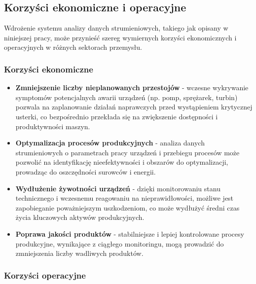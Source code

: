 \subsection{Korzyści ekonomiczne i operacyjne}
\label{subsec:korzysci}

Wdrożenie systemu analizy danych strumieniowych, takiego jak opisany w niniejszej pracy, może przynieść szereg wymiernych korzyści ekonomicznych i operacyjnych w różnych sektorach przemysłu.

\subsubsection{Korzyści ekonomiczne}
\label{subsubsec:korzysci_ekonomiczne}

\begin{itemize}
    \item \textbf{Zmniejszenie liczby nieplanowanych przestojów} - wczesne wykrywanie symptomów potencjalnych awarii urządzeń (np. pomp, sprężarek, turbin) pozwala na zaplanowanie działań naprawczych przed wystąpieniem krytycznej usterki, co bezpośrednio przekłada się na zwiększenie dostępności i produktywności maszyn.
    \item \textbf{Optymalizacja procesów produkcyjnych} - analiza danych strumieniowych o parametrach pracy urządzeń i przebiegu procesów może pozwolić na identyfikację nieefektywności i obszarów do optymalizacji, prowadząc do oszczędności surowców i energii.
    \item \textbf{Wydłużenie żywotności urządzeń} - dzięki monitorowaniu stanu technicznego i wczesnemu reagowaniu na nieprawidłowości, możliwe jest zapobieganie poważniejszym uszkodzeniom, co może wydłużyć średni czas życia kluczowych aktywów produkcyjnych.
    \item \textbf{Poprawa jakości produktów} - stabilniejsze i lepiej kontrolowane procesy produkcyjne, wynikające z ciągłego monitoringu, mogą prowadzić do zmniejszenia liczby wadliwych produktów.
\end{itemize}

\subsubsection{Korzyści operacyjne}
\label{subsubsec:korzysci_operacyjne}

